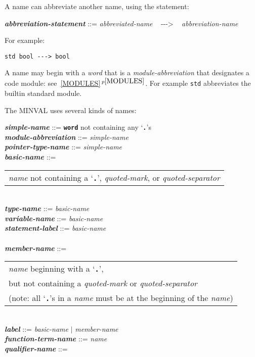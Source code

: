 \documentclass[12pt]{article}
\newcommand{\TT}[1]{{\tt \bfseries #1}}
\newcommand{\ABV}{-{}-{}->}
\newcommand{\emkey}[1]{{\em \bfseries #1}}
\newcommand{\itemref}[1]{\ref{#1}$\,^{p\pageref{#1}}$}
\newenvironment{indpar}[1][0.3in]%
	{\begin{list}{}%
		     {\setlength{\itemsep}{0in}%
		      \setlength{\topsep}{0in}%
		      \setlength{\parsep}{1ex}%
		      \setlength{\labelwidth}{#1}%
		      \setlength{\leftmargin}{#1}%
		      \addtolength{\leftmargin}{\labelsep}}%
	 \item}%
	{\end{list}}
\begin{document}
A name can abbreviate another name, using the statement:
\begin{indpar}
\emkey{abbreviation-statement} ::=
    {\em abbreviated-name} ~ \ABV{} ~ {\em abbreviation-name}
\end{indpar}
For example:
\begin{center}
\tt std bool \ABV{} bool
\end{center}

A name may begin with a {\em word} that is a {\em module-abbreviation}
that designates a code module: see~\itemref{MODULES}.
For example {\tt std} abbreviates the builtin standard module.

The MINVAL uses several kinds of names:

\begin{indpar}
\emkey{simple-name} ::= \TT{word} not containing any `\TT{.}'s \\
\emkey{module-abbreviation} ::= {\em simple-name} \\
\emkey{pointer-type-name}\label{POINTER-TYPE-NAME} ::=
    {\em simple-name}
\\[1ex]
\emkey{basic-name}
	::= \begin{tabular}[t]{@{}l@{}}
	    {\em name} not containing a `\TT{.}', {\em quoted-mark}, or
	    {\em quoted-separator}
	    \end{tabular} \\
\emkey{type-name}\label{TYPE-NAME} ::=
    {\em basic-name} \\
\emkey{variable-name}\label{VARIABLE-NAME} ::=
    {\em basic-name} \\
\emkey{statement-label} ::= {\em basic-name}
    \label{STATEMENT-LABEL} \\
\\[1ex]
\emkey{member-name}\label{MEMBER-NAME}
	::= \begin{tabular}[t]{@{}l@{}}
                        {\em name} beginning with a `\TT{.}', \\
			but not containing a {\em quoted-mark} or
			    {\em quoted-separator} \\
			(note: all `\TT{.}'s in a {\em name} must be at
			 the beginning of the {\em name})
			\end{tabular} \\
\emkey{label}\label{LABEL} ::=
    {\em basic-name} $|$ {\em member-name}
\\[1ex]
\emkey{function-term-name} ::= {\em name}
    \label{FUNCTION-TERM-NAME}
\\[1ex]
\emkey{qualifier-name}\label{QUALIFIER-NAME} ::=

\end{indpar}
\end{document}
